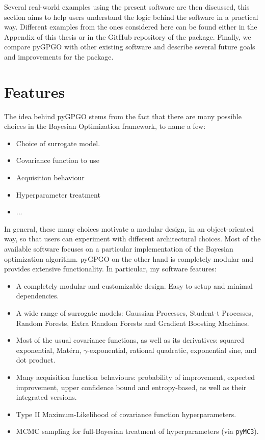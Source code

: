 \documentclass[10pt,a4paper,twoside]{book}
\begin{document}
Several real-world examples using the present software are then discussed, this section aims to help users understand the logic behind the software in a practical way. Different examples from the ones considered here can be found either in the Appendix of this thesis or in the GitHub repository of the package. Finally, we compare pyGPGO with other existing software and describe several future goals and improvements for the package.


\section{Features}\label{features}

The idea behind pyGPGO stems from the fact that there are many possible choices in the Bayesian Optimization framework, to name a few: 

\begin{itemize}
\item Choice of surrogate model.
\item Covariance function to use
\item Acquisition behaviour
\item Hyperparameter treatment
\item ...
\end{itemize}

In general, these many choices motivate a modular design, in an object-oriented way, so that users can experiment with different architectural choices. Most of the available software focuses on a particular implementation of the Bayesian optimization algorithm. pyGPGO on the other hand is completely modular and provides extensive functionality. In particular, my software features: 

\begin{itemize}
\item A completely modular and customizable design. Easy to setup and minimal dependencies. 
\item A wide range of surrogate models: Gaussian Processes, Student-t Processes, Random Forests, Extra Random Forests and Gradient Boosting Machines.
\item Most of the usual covariance functions, as well as its derivatives: squared exponential, Matérn, $\gamma$-exponential, rational quadratic, exponential sine, and dot product.
\item Many acquisition function behaviours: probability of improvement, expected improvement, upper confidence bound and entropy-based, as well as their integrated versions. 
\item Type II Maximum-Likelihood of covariance function hyperparameters. 
\item MCMC sampling for full-Bayesian treatment of hyperparameters (via \texttt{pyMC3}).
\end{itemize}
\end{document}
